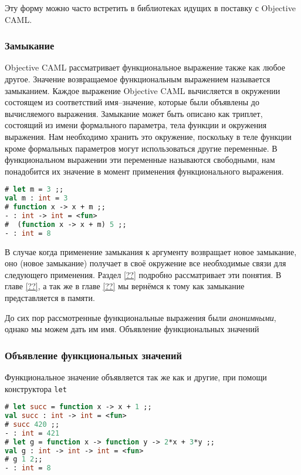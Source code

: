 Эту форму можно часто встретить в библиотеках идущих в поставку с Objective
CAML.

\subsubsection{Замыкание}

Objective CAML рассматривает функциональное выражение также как любое другое.
Значение возвращаемое функциональным выражением называется замыканием. Каждое
выражение Objective CAML вычисляется в окружении состоящем из соответствий
имя–значение, которые были объявлены до вычисляемого выражения. Замыкание может
быть описано как триплет, состоящий из имени формального параметра, тела функции
и окружения выражения. Нам необходимо хранить это окружение, поскольку в теле
функции кроме формальных параметров могут использоваться другие переменные. В
функциональном выражении эти переменные называются свободными, нам понадобится
их значение в момент применения функционального выражения.

\begin{lstlisting}[language=OCaml]
# let m = 3 ;;
val m : int = 3
# function x -> x + m ;;
- : int -> int = <fun>
#  (function x -> x + m) 5 ;;
- : int = 8
\end{lstlisting}

В случае когда применение замыкания к аргументу возвращает новое замыкание, оно
(новое замыкание) получает в своё окружение все необходимые связи для следующего
применения. Раздел \ref{??} подробно рассматривает эти понятия. В главе
\ref{??}, а так же в главе \ref{??} мы вернёмся к тому как замыкание
представляется в памяти.

До сих пор рассмотренные функциональные выражения были {\it анонимными}, однако
мы можем дать им имя.
Объявление функциональных значений

\subsubsection{Объявление функциональных значений}

Функциональное значение объявляется так же как и другие, при помощи конструктора
\texttt{let}

\begin{lstlisting}[language=OCaml]
# let succ = function x -> x + 1 ;;
val succ : int -> int = <fun>
# succ 420 ;;
- : int = 421
# let g = function x -> function y -> 2*x + 3*y ;;
val g : int -> int -> int = <fun>
# g 1 2;;
- : int = 8
\end{lstlisting}


